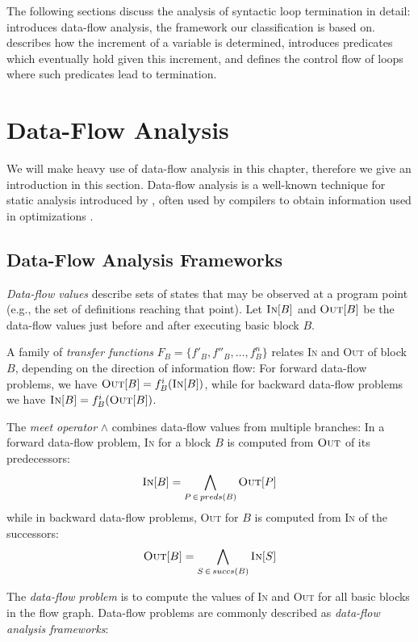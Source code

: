 The following sections discuss the analysis of syntactic loop termination in detail:  introduces data-flow analysis, the framework our classification is based on.  describes how the increment of a variable is determined,  introduces predicates which eventually hold given this increment, and  defines the control flow of loops where such predicates lead to termination.

\section{Data-Flow Analysis}
\label{sec:dfa}

We will make heavy use of data-flow analysis in this chapter, therefore we give an introduction in this section. Data-flow analysis is a well-known technique for static analysis introduced by \citeauthor{DBLP:conf/popl/Kildall73} \cite{DBLP:conf/popl/Kildall73}, often used by compilers to obtain information used in optimizations \cite{DBLP:books/aw/AhoSU86}.

\subsection{Data-Flow Analysis Frameworks}

\emph{Data-flow values} describe sets of states that may be observed at a program point (e.g., the set of definitions reaching that point). Let $\textsc{In}[B]$ and $\textsc{Out}[B]$ be the data-flow values just before and after executing basic block $B$.

A family of \emph{transfer functions} $F_B = \{f'_B, f''_B, \dots, f^n_B \}$ relates \textsc{In} and \textsc{Out} of block $B$, depending on the direction of information flow: For forward data-flow problems, we have $\textsc{Out}[B] = f^i_B(\textsc{In}[B])$, while for backward data-flow problems we have $\textsc{In}[B] = f^i_B(\textsc{Out}[B])$.

The \emph{meet operator} $\wedge$ combines data-flow values from multiple branches: In a forward data-flow problem, \textsc{In} for a block $B$ is computed from $\textsc{Out}$ of its predecessors:
\[
    \textsc{In}[B] = \bigwedge\limits_{P\, \in\, preds(B)} \textsc{Out}[P]
\]
while in backward data-flow problems, \textsc{Out} for $B$ is computed from \textsc{In} of the successors:
\[
    \textsc{Out}[B] = \bigwedge\limits_{S\, \in\, succs(B)} \textsc{In}[S]
\]

The \emph{data-flow problem} is to compute the values of \textsc{In} and \textsc{Out} for all basic blocks in the flow graph. Data-flow problems are commonly described as \emph{data-flow analysis frameworks}:

